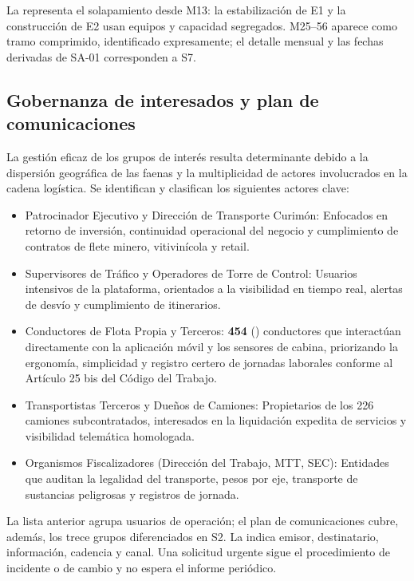 La  representa el solapamiento desde M13: la estabilización de E1 y la construcción de E2 usan equipos y capacidad segregados. M25–56 aparece como tramo comprimido, identificado expresamente; el detalle mensual y las fechas derivadas de SA-01 corresponden a S7.

\FloatBarrier
\subsection{Gobernanza de interesados y plan de comunicaciones}\label{sec:6-gestion-interesados}\label{sec:06-gobernanza-de-interesados-y-plan-de-comunicaciones}

La gestión eficaz de los grupos de interés resulta determinante debido a la dispersión geográfica de las faenas y la multiplicidad de actores involucrados en la cadena logística. Se identifican y clasifican los siguientes actores clave:

\begin{itemize}
\item Patrocinador Ejecutivo y Dirección de Transporte Curimón: Enfocados en retorno de inversión, continuidad operacional del negocio y cumplimiento de contratos de flete minero, vitivinícola y retail.
\item Supervisores de Tráfico y Operadores de Torre de Control: Usuarios intensivos de la plataforma, orientados a la visibilidad en tiempo real, alertas de desvío y cumplimiento de itinerarios.
\item Conductores de Flota Propia y Terceros: \textbf{454} () conductores que interactúan directamente con la aplicación móvil y los sensores de cabina, priorizando la ergonomía, simplicidad y registro certero de jornadas laborales conforme al Artículo 25 bis del Código del Trabajo.
\item Transportistas Terceros y Dueños de Camiones: Propietarios de los 226 camiones subcontratados, interesados en la liquidación expedita de servicios y visibilidad telemática homologada.
\item Organismos Fiscalizadores (Dirección del Trabajo, MTT, SEC): Entidades que auditan la legalidad del transporte, pesos por eje, transporte de sustancias peligrosas y registros de jornada.
\end{itemize}

La lista anterior agrupa usuarios de operación; el plan de comunicaciones cubre, además, los trece grupos diferenciados en S2. La  indica emisor, destinatario, información, cadencia y canal. Una solicitud urgente sigue el procedimiento de incidente o de cambio y no espera el informe periódico.

